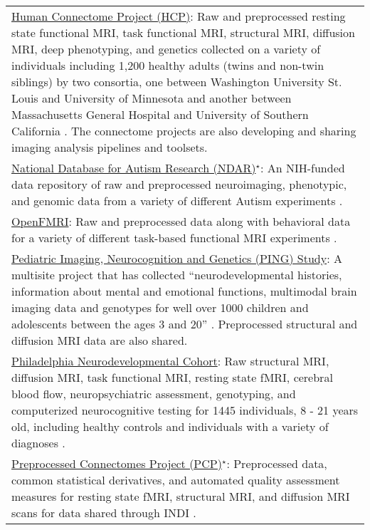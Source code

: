 \documentclass{bmcart}
\begin{document}
\begin{backmatter}
\begin{table}[h!]
\begin{tabular}{L{5.5in}}
        \href{http://www.humanconnectomeproject.org/}{Human Connectome Project (HCP)}: Raw and preprocessed resting state functional MRI, task functional MRI, structural MRI, diffusion MRI, deep phenotyping, and genetics collected on a variety of individuals including 1,200 healthy adults (twins and non-twin siblings) by two consortia, one between Washington University St. Louis and University of Minnesota \cite{VanEssen2012} and another between Massachusetts General Hospital and University of Southern California \cite{RosenHCP2010}. The connectome projects are also developing and sharing imaging analysis pipelines and toolsets.\\
        \href{http://ndar.nih.gov/}{National Database for Autism Research (NDAR)}$^{\star}$: An NIH-funded data repository of raw and preprocessed neuroimaging, phenotypic, and genomic data from a variety of different Autism experiments \cite{NDAR}.\\	
        \href{https://openfmri.org/}{OpenFMRI}: Raw and preprocessed data along with behavioral data for a variety of different task-based functional MRI experiments \cite{openfmri}. \\
        \href{http://pingstudy.ucsd.edu/}{Pediatric Imaging, Neurocognition and Genetics (PING) Study}: A multisite project that has collected ``neurodevelopmental histories, information about mental and emotional functions, multimodal brain imaging data and genotypes for well over 1000 children and adolescents between the ages 3 and 20'' \cite{JerniganPING}. Preprocessed structural and diffusion MRI data are also shared.\\
        \href{http://www.med.upenn.edu/bbl/projects/pnc/PhiladelphiaNeurodevelopmentalCohort.shtml}{Philadelphia Neurodevelopmental Cohort}: Raw structural MRI, diffusion MRI, task functional MRI, resting state fMRI, cerebral blood flow, neuropsychiatric assessment, genotyping, and computerized neurocognitive testing for 1445 individuals, 8 - 21 years old, including healthy controls and individuals with a variety of diagnoses \cite{Satterthwaite2014}.\\
        \href{http://preprocessed-connectomes-project.github.io/}{Preprocessed Connectomes Project (PCP)}$^{\star}$: Preprocessed data, common statistical derivatives, and automated quality assessment measures for resting state fMRI, structural MRI, and diffusion MRI scans for data shared through INDI \cite{CraddockPCP}. \\
        \hline
      \end{tabular}
\end{table}

\end{backmatter}
\end{document}
